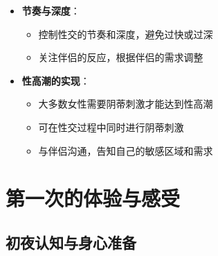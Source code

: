 \documentclass[12pt,UTF8]{ctexbook}
\begin{document}
\begin{itemize}
\begin{itemize}
    \begin{itemize}
    \item \textbf{背痛问题}：选择侧卧位或女上位，避免长时间保持同一姿势
    \item \textbf{膝盖问题}：选择坐姿或侧卧位，避免跪姿或需要膝盖支撑的姿势
    \item \textbf{肥胖问题}：选择侧卧位、女上位或坐姿，避免需要太多体力的姿势
    \item \textbf{残疾问题}：根据具体情况调整姿势，使用枕头、靠垫等辅助工具增加舒适度
    \end{itemize}
  \item 选择姿势的建议：
    \begin{itemize}
    \item 考虑双方的身体状况和舒适度，如体重、身高、关节问题等
    \item 根据不同阶段的需求选择姿势，如前戏阶段适合亲密的姿势，高潮阶段适合刺激强烈的姿势
    \item 不要害怕尝试新的姿势，但要注意彼此的感受，及时调整
    \item 保持沟通，询问对方的喜好和舒适度
    \item 可使用枕头等辅助工具，增加舒适度和刺激性
    \end{itemize}
  \end{itemize}
\item \textbf{节奏与深度}：
  \begin{itemize}
  \item 控制性交的节奏和深度，避免过快或过深
  \item 关注伴侣的反应，根据伴侣的需求调整
  \end{itemize}
\item \textbf{性高潮的实现}：
  \begin{itemize}
  \item 大多数女性需要阴蒂刺激才能达到性高潮
  \item 可在性交过程中同时进行阴蒂刺激
  \item 与伴侣沟通，告知自己的敏感区域和需求
  \end{itemize}
\end{itemize}

\chapter{第一次的体验与感受}

\section{初夜认知与身心准备}
\end{document}
